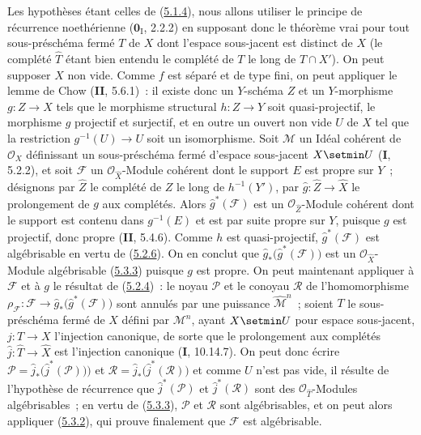 Les hypothèses étant celles de (\hyperref[III.5.1.4-fr]{5.1.4}), nous allons
utiliser le principe de récurrence noethérienne ($\mathbf{0}_{\mathrm I}$, 2.2.2) en supposant
donc le théorème vrai pour tout sous-préschéma fermé $T$ de $X$ dont l'espace
sous-jacent est distinct de $X$ (le complété $\widehat T$ étant bien entendu le
complété de $T$ le long de $T\cap X'$). On peut supposer $X$ non vide. Comme $f$
est séparé et de type fini, on peut appliquer le lemme de Chow (\textbf{II}, 5.6.1)~: il
existe donc un $Y$-schéma $Z$ et un $Y$-morphisme $g:Z\to X$ tels que le morphisme
structural $h:Z\to Y$ soit quasi-projectif, le morphisme $g$ projectif et surjectif,
et en outre un ouvert non vide $U$ de $X$ tel que la restriction
$g^{-1}(U)\to U$ soit un isomorphisme. Soit $\mathcal M$ un Idéal cohérent de
$\mathcal O_X$ définissant un sous-préschéma fermé d'espace sous-jacent $X\setmin U$
(\textbf{I}, 5.2.2), et soit $\mathcal F$ un $\mathcal O_{\widehat X}$-Module cohérent dont
le support $E$ est propre sur $Y$~; désignons par $\widehat Z$ le complété de $Z$
le long de $h^{-1}(Y')$, par $\widehat g:\widehat Z\to\widehat X$ le prolongement
de $g$ aux complétés. Alors $\widehat g^{*}(\mathcal F)$ est un
$\mathcal O_{\widehat Z}$-Module cohérent dont le support est contenu dans
$g^{-1}(E)$ et est par suite propre sur $Y$, puisque $g$ est projectif, donc propre
(\textbf{II}, 5.4.6). Comme $h$ est quasi-projectif, $\widehat g^{*}(\mathcal F)$ est
algébrisable en vertu de (\hyperref[III.5.2.6-fr]{5.2.6}). On en conclut
que $\widehat g_*\bigl(\widehat g^{*}(\mathcal F)\bigr)$ est un
$\mathcal O_{\widehat X}$-Module algébrisable
(\hyperref[III.5.3.3-fr]{5.3.3}) puisque $g$ est propre. On peut maintenant
appliquer à $\mathcal F$ et à $g$ le résultat de
(\hyperref[III.5.2.4-fr]{5.2.4})~: le noyau $\mathcal P$ et le conoyau
$\mathcal R$ de l'homomorphisme
$\rho_{\mathcal F}:\mathcal F\to
\widehat g_*\bigl(\widehat g^{*}(\mathcal F)\bigr)$ sont annulés par une
puissance $\widehat{\mathcal M}^{n}$~; soient $T$ le sous-préschéma fermé de $X$
défini par $\mathcal M^n$, ayant $X\setmin U$ pour espace sous-jacent,
$j:T\to X$ l'injection canonique, de sorte que le prolongement aux complétés
$\widehat j:\widehat T\to\widehat X$ est l'injection canonique (\textbf{I}, 10.14.7). On
peut donc écrire
$\mathcal P=\widehat j_*\bigl(\widehat j^{*}(\mathcal P)\bigr))$ et
$\mathcal R=\widehat j_*\bigl(\widehat j^{*}(\mathcal R)\bigr)$ et comme $U$
n'est pas vide, il résulte de l'hypothèse de récurrence que
$\widehat j^{*}(\mathcal P)$ et $\widehat j^{*}(\mathcal R)$ sont des
$\mathcal O_{\widehat T}$-Modules algébrisables~; en vertu de
(\hyperref[III.5.3.3-fr]{5.3.3}), $\mathcal P$ et $\mathcal R$ sont
algébrisables, et on peut alors appliquer (\hyperref[III.5.3.2-fr]{5.3.2}), qui
prouve finalement que $\mathcal F$ est algébrisable.

